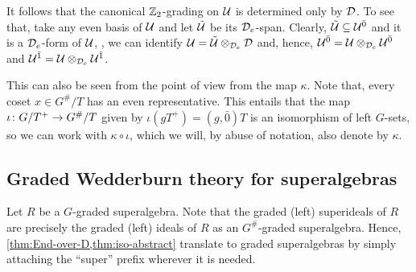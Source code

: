 It follows that the canonical $\mathbb{Z}_2$-grading on $\mathcal U$ is determined only by $\mathcal{D}$. 
To see that, take any even basis of $\mathcal U$ and let $\tilde {\mathcal U}$ be its $\mathcal{D}_e$-span. 
Clearly, $\tilde {\mathcal U} \subseteq \mathcal U^{\bar0}$ and it is a  $\mathcal{D}_e$-form of $\mathcal U$, \ie, we can identify $\mathcal U = \tilde{\mathcal U} \otimes_{\mathcal{D}_e} \mathcal{D}$ and, hence, $\mathcal U^{\bar0} = \mathcal U \otimes_{\mathcal{D}_e} \mathcal U^{\bar0}$ and  $\mathcal U^{\bar1} = \mathcal U \otimes_{\mathcal{D}_e} \mathcal U^{\bar1}$. 

This can also be seen from the point of view from the map $\kappa$. 
Note that, every coset $x \in G^\#/T$ has an even representative. 
This entails that the map $\iota\colon G/T^+ \to G^\#/T$ given by $\iota ( gT^+) = (g, \bar 0) T$ is an isomorphism of left $G$-sets, so we can work with $\kappa \circ \iota$, which we will, by abuse of notation, also denote by $\kappa$.

\subsection{Graded Wedderburn theory for superalgebras}\label{ssec:wedderburn-super}

Let $R$ be a $G$-graded superalgebra. 
Note that the graded (left) superideals of $R$ are precisely the graded (left) ideals of $R$ as an $G^\#$-graded superalgebra. 
Hence, \cref{thm:End-over-D,thm:iso-abstract} translate to graded superalgebras by simply attaching the ``super'' prefix wherever it is needed. 



